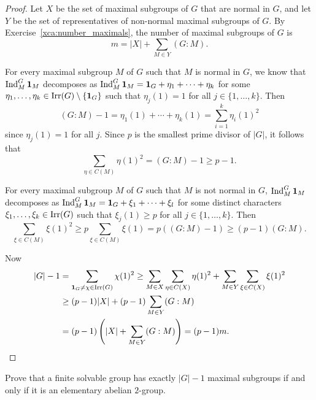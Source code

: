 \begin{proof}
    
   Let $X$ be the set of maximal subgroups of $G$ that are normal in $G$, and 
   let $Y$ be the set of representatives of non-normal 
   maximal subgroups of $G$. By Exercise~\ref{xca:number_maximals}, 
   the number of 
   maximal subgroups of $G$ is 
   \[
   m=|X|+\sum_{M\in Y}(G:M).
   \]

   For every maximal subgroup $M$ of $G$ such that $M$ is normal in $G$, 
   we know that $\operatorname{Ind}_M^G\mathbf{1}_M$ decomposes 
   as $\operatorname{Ind}_M^G\mathbf{1}_M=\mathbf{1}_G+\eta_1+\cdots+\eta_k$ for some  
   $\eta_1,\dots,\eta_k\in\operatorname{Irr}(G)\setminus\{\mathbf{1}_G\}$ such that 
   $\eta_j(1)=1$ for all $j\in\{1,\dots,k\}$. Then
   \[
   (G:M)-1=\eta_1(1)+\cdots+\eta_k(1)=\sum_{i=1}^k\eta_i(1)^2
   \]
   since $\eta_j(1)=1$ for all $j$. Since $p$ is the smallest prime divisor of $|G|$, 
   it follows that 
   \[
   \sum_{\eta\in C(M)}\eta(1)^2
   =(G:M)-1\geq p-1.
   \]

   For every maximal subgroup $M$ of $G$ such that $M$ is not normal in $G$, 
   $\operatorname{Ind}_M^G\mathbf{1}_M$ decomposes 
   as $\operatorname{Ind}_M^G\mathbf{1}_M=\mathbf{1}_G+\xi_1+\cdots+\xi_l$ for some distinct characters 
   $\xi_1,\dots,\xi_k\in\operatorname{Irr}(G)$ 
   such that $\xi_j(1)\geq p$ for all $j\in\{1,\dots,k\}$. 
   Then 
   \[
   \sum_{\xi\in C(M)}\xi(1)^2
   \geq p\sum_{\xi\in C(M)}\xi(1)
   =p((G:M)-1)
   \geq (p-1)(G:M).
   \]

   Now 
   \begin{align*}
    |G|-1 &=\sum_{\mathbf{1}_G\ne\chi\in\operatorname{Irr}(G)}\chi(1)^2
    \geq\sum_{M\in X}\sum_{\eta\in C(X)}\eta(1)^2
    +\sum_{M\in Y}\sum_{\xi\in C(X)}\xi(1)^2\\
    &\geq (p-1)|X|+(p-1)\sum_{M\in Y}(G:M)\\
    &=(p-1)\left(|X|+\sum_{M\in Y}(G:M)\right)=(p-1)m.\qedhere 
   \end{align*}
\end{proof}

\begin{exercise}
    Prove that a finite solvable group has exactly $|G|-1$ maximal subgroups
    if and only if it is an elementary abelian $2$-group. 
\end{exercise}

